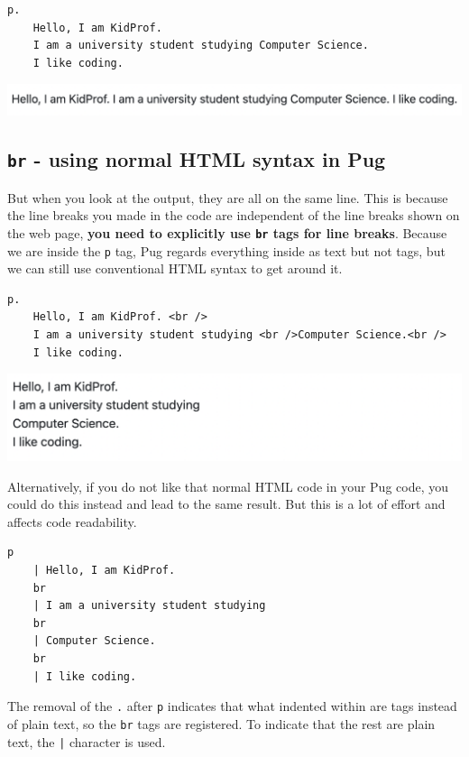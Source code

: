\begin{lstlisting}[language=pug]
p.
	Hello, I am KidProf.
	I am a university student studying Computer Science.
	I like coding.
\end{lstlisting}

\includegraphics[width=15cm]{images/ch5-textinaline.png}

\subsection*{\texttt{br} - using normal HTML syntax in Pug}
\label{sec:br}

But when you look at the output, they are all on the same line. This is because the line breaks you made in the code are independent of the line breaks shown on the web page, \textbf{you need to explicitly use \texttt{br} tags for line breaks}. Because we are inside the \texttt{p} tag, Pug regards everything inside as text but not tags, but we can still use conventional HTML syntax to get around it.

\begin{lstlisting}[language=pug]
p.
	Hello, I am KidProf. <br />
	I am a university student studying <br />Computer Science.<br />
	I like coding.
\end{lstlisting}

\includegraphics[width=15cm]{images/ch5-textmultiplelines.png}

Alternatively, if you do not like that normal HTML code in your Pug code, you could do this instead and lead to the same result. But this is a lot of effort and affects code readability.

\begin{lstlisting}[language=pug]
p
	| Hello, I am KidProf.
	br
	| I am a university student studying
	br
	| Computer Science.
	br
	| I like coding.
\end{lstlisting}

The removal of the \texttt{.} after \texttt{p} indicates that what indented within are tags instead of plain text, so the \texttt{br} tags are registered. To indicate that the rest are plain text, the \texttt{|} character is used.
\vspace{6mm}

